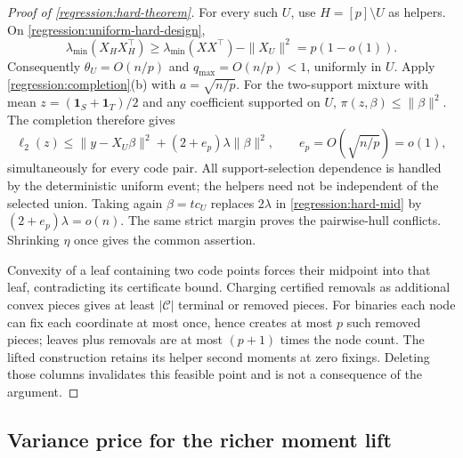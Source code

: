 \begin{proof}[Proof of \cref{regression:hard-theorem}]
For every such $U$, use $H=[p]\setminus U$ as helpers.
On \eqref{regression:uniform-hard-design},
\[
 \lambda_{\min}(X_HX_H^\top)
 \geq\lambda_{\min}(XX^\top)-\|X_U\|^2=p(1-o(1)).
\]
Consequently $\theta_U=O(n/p)$ and $q_{\max}=O(n/p)<1$,
uniformly in $U$. Apply \cref{regression:completion}(b) with
$a=\sqrt{n/p}$.
For the two-support mixture with mean
$z=(\mathbf1_S+\mathbf1_T)/2$ and any coefficient supported on
$U$, $\pi(z,\beta)\leq\|\beta\|^2$. The completion therefore gives
\[
 \ell_2(z)\leq\|y-X_U\beta\|^2+(2+e_p)\lambda\|\beta\|^2,
 \qquad e_p=O(\sqrt{n/p})=o(1),
\]
simultaneously for every code pair. All support-selection dependence
is handled by the deterministic uniform event; the helpers need
not be independent of the selected union.
Taking again $\beta=t c_U$ replaces $2\lambda$ in
\eqref{regression:hard-mid} by $(2+e_p)\lambda=o(n)$.
The same strict margin proves the pairwise-hull conflicts.
Shrinking $\eta$ once gives the common assertion.

Convexity of a leaf containing two code points forces their midpoint
into that leaf, contradicting its certificate bound. Charging
certified removals as additional convex pieces gives at least
$|\mathcal C|$ terminal or removed pieces. For binaries each node
can fix each coordinate at most once, hence creates at most $p$
such removed pieces; leaves plus removals are at most $(p+1)$
times the node count. The lifted construction retains its helper
second moments at zero fixings. Deleting those columns invalidates
this feasible point and is not a consequence of the argument.
\end{proof}

\subsection{Variance price for the richer moment lift}
\label{app:regression:variance}


